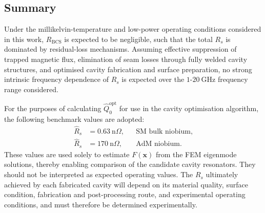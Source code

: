 \documentclass[
  aps,
  physrev,
  reprint,
  superscriptaddress,
  nofootinbib,
  amsmath,
  amssymb
]{revtex4-2}
\begin{document}
\subsection[\appendixname~\thesubsection]{Summary}

Under the millikelvin-temperature and low-power operating conditions considered in this work, $R_{\mathrm{BCS}}$ is expected to be negligible, such that the total $R_s$ is dominated by residual-loss mechanisms. Assuming effective suppression of trapped magnetic flux, elimination of seam losses through fully welded cavity structures, and optimised cavity fabrication and surface preparation, no strong intrinsic frequency dependence of $R_s$ is expected over the $1$-$20~\mathrm{GHz}$ frequency range considered.

For the purposes of calculating $\hat Q_0^{\mathrm{opt}}$ for use in the cavity optimisation algorithm, the following benchmark values are adopted:
\begin{align}
    \hat R_s &= 0.63~\mathrm{n}\Omega, && \text{SM bulk niobium,} \\
    \hat R_s &= 170~\mathrm{n}\Omega, && \text{AdM niobium.}
\end{align}
These values are used solely to estimate $F(\mathbf{x})$ from the FEM eigenmode solutions, thereby enabling comparison of the candidate cavity resonators. They should not be interpreted as expected operating values. The $R_s$ ultimately achieved by each fabricated cavity will depend on its material quality, surface condition, fabrication and post-processing route, and experimental operating conditions, and must therefore be determined experimentally.
\end{document}

